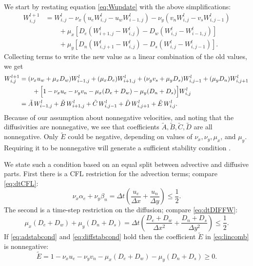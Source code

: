 \documentclass[11pt,final]{amsart}
\newcommand{\Wlij}{W^l_{i,j}}
\begin{document}
We start by restating equation \eqref{eq:Wupdate} with the above simplifications:
\begin{align*}
 W_{i,j}^{l+1} &= \Wlij - \nu_x \left(u_e \Wlij - u_w W_{i-1,j}^l\right) - \nu_y \left(v_n \Wlij - v_s W_{i,j-1}^l\right)  \\
      &\qquad + \mu_x \left[D_e \left(W_{i+1,j}^l - \Wlij\right) - D_w \left(\Wlij - W_{i-1,j}^l\right)\right]  \\
      &\qquad + \mu_y \left[D_n \left(W_{i,j+1}^l - \Wlij\right) - D_s \left(\Wlij - W_{i,j-1}^l\right)\right].
\end{align*}
Collecting terms to write the new value as a linear combination of the old values, we get
\begin{align}
 W_{i,j}^{l+1} &= (\nu_x u_w + \mu_x D_w) W_{i-1,j}^l + (\mu_x D_e) W_{i+1,j}^l + (\nu_y v_s + \mu_y D_s) W_{i,j-1}^l + (\mu_y D_n) W_{i,j+1}^l  \notag \\
      &\qquad + \Big[1 - \nu_x u_e - \nu_y v_n - \mu_x (D_e + D_w) - \mu_y (D_n + D_s)\Big] \Wlij \notag \\
  &= \tilde A\, W_{i-1,j}^l + \tilde B\, W_{i+1,j}^l + \tilde C\, W_{i,j-1}^l + \tilde D\, W_{i,j+1}^l + \tilde E\, \Wlij. \label{eq:lincomb}
\end{align}
Because of our assumption about nonnegative velocities, and noting that the diffusivities are nonnegative, we see that coefficients $\tilde A,\tilde B,\tilde C,\tilde D$ are all nonnegative.  Only $\tilde E$ could be negative, depending on values of $\nu_x, \nu_y, \mu_x$, and $\mu_y$.  Requiring it to be nonnegative will generate a sufficient stability condition \citep{MortonMayers}.

We state such a condition based on an equal split between advective and diffusive parts.  First there is a CFL restriction for the advection terms; compare \eqref{eq:dtCFL}:
\begin{equation}
\nu_x \alpha_e + \nu_y \beta_n = \Delta t \left(\frac{u_e}{\Delta x} + \frac{u_n}{\Delta y}\right) \le \frac{1}{2}. \label{eq:adstabcond}
\end{equation}
The second is a time-step restriction on the diffusion; compare \eqref{eq:dtDIFFW}:
\begin{equation}
\mu_x (D_e + D_w) + \mu_y (D_n + D_s) = \Delta t \left(\frac{D_e + D_w}{\Delta x^2} + \frac{D_n + D_s}{\Delta y^2}\right) \le \frac{1}{2}. \label{eq:diffstabcond}
\end{equation}
If \eqref{eq:adstabcond} and \eqref{eq:diffstabcond} hold then the coefficient $\tilde E$ in \eqref{eq:lincomb} is nonnegative:
	$$\tilde E = 1 - \nu_x u_e - \nu_y v_n - \mu_x (D_e + D_w) - \mu_y (D_n + D_s) \ge 0.$$
\end{document}
